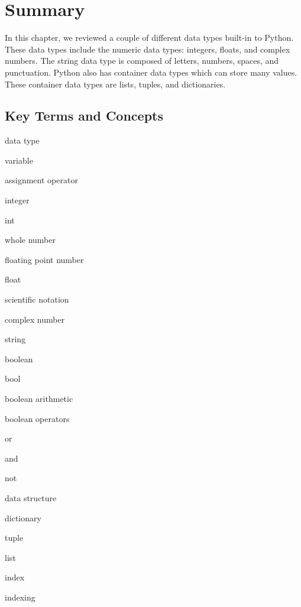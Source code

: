 \documentclass{book}
\newenvironment{key_terms}{\begin{multicols}{3}}{\end{multicols}} %
\begin{document}
    
        \newpage
        \section{Summary}\label{summary}

    




    
        In this chapter, we reviewed a couple of different data types built-in
to Python. These data types include the numeric data types: integers,
floats, and complex numbers. The string data type is composed of
letters, numbers, spaces, and punctuation. Python also has container
data types which can store many values. These container data types are
lists, tuples, and dictionaries.
    




    
        \subsection{Key Terms and Concepts}\label{key-terms-and-concepts}
    




    
        \begin{key_terms}
        data type

variable

assignment operator

integer

int

whole number

floating point number

float

scientific notation

complex number

string

boolean

bool

boolean arithmetic

boolean operators

or

and

not

data structure

dictionary

tuple

list

index

indexing
        \end{key_terms}
\end{document}
